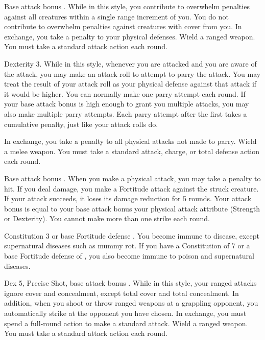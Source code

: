 \featpre Base attack bonus .
 While in this style, you contribute to overwhelm penalties against all creatures within a single range increment of you. You do not contribute to overwhelm penalties against creatures with cover from you. In exchange, you take a  penalty to your physical defenses.
\stylereq Wield a ranged weapon. You must take a standard attack action each round.

\featpre Dexterity 3.
\featben While in this style, whenever you are attacked and you are aware of the attack, you may make an attack roll to attempt to parry the attack. You may treat the result of your attack roll as your physical defense against that attack if it would be higher. You can normally make one parry attempt each round. If your base attack bonus is high enough to grant you multiple attacks, you may also make multiple parry attempts. Each parry attempt after the first takes a cumulative  penalty, just like your attack rolls do.

In exchange, you take a  penalty to all physical attacks not made to parry.
\stylereq Wield a melee weapon. You must take a standard attack, charge, or total defense action each round.

\featpre Base attack bonus .
\featben When you make a physical attack, you may take a  penalty to hit. If you deal damage, you make a Fortitude attack against the struck creature. If your attack succeeds, it loses its damage reduction for 5 rounds. Your attack bonus is equal to your base attack bonus \add your physical attack attribute (Strength or Dexterity). You cannot make more than one strike each round.

\featpre Constitution 3 or base Fortitude defense .
\featben You become immune to disease, except supernatural diseases such as mummy rot. If you have a Constitution of 7 or a base Fortitude defense of , you also become immune to poison and supernatural diseases.

 Dex 5, Precise Shot, base attack bonus .
 While in this style, your ranged attacks ignore cover and concealment, except total cover and total concealment. In addition, when you shoot or throw ranged weapons at a grappling opponent, you automatically strike at the opponent you have chosen. In exchange, you must spend a full-round action to make a standard attack.
\stylereq Wield a ranged weapon. You must take a standard attack action each round.

